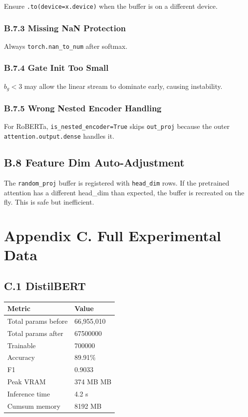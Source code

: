 Ensure \texttt{.to(device=x.device)} when the buffer is on a different device.

\subsubsection{B.7.3 Missing NaN Protection}

Always \texttt{torch.nan\_to\_num} after softmax.

\subsubsection{B.7.4 Gate Init Too Small}

$b_g < 3$ may allow the linear stream to dominate early, causing instability.

\subsubsection{B.7.5 Wrong Nested Encoder Handling}

For RoBERTa, \texttt{is\_nested\_encoder=True} skips \texttt{out\_proj} because the outer 
\texttt{attention.output.dense} handles it.

\subsection{B.8 Feature Dim Auto-Adjustment}

The \texttt{random\_proj} buffer is registered with \texttt{head\_dim} rows. If the 
pretrained attention has a different head\_dim than expected, the buffer is 
recreated on the fly. This is safe but inefficient.



\section{Appendix C. Full Experimental Data}

\subsection{C.1 DistilBERT}

\begin{table}[H]
\centering
\small
\begin{tabular}{ll}
\toprule
\textbf{Metric} & \textbf{Value} \\
\midrule
Total params before & 66,955,010 \\
Total params after & 67500000 \\
Trainable & 700000 \\
Accuracy & 89.91\% \\
F1 & 0.9033 \\
Peak VRAM & 374 MB MB \\
Inference time & 4.2 s \\
Cumsum memory & 8192 MB \\
\bottomrule
\end{tabular}
\end{table}

